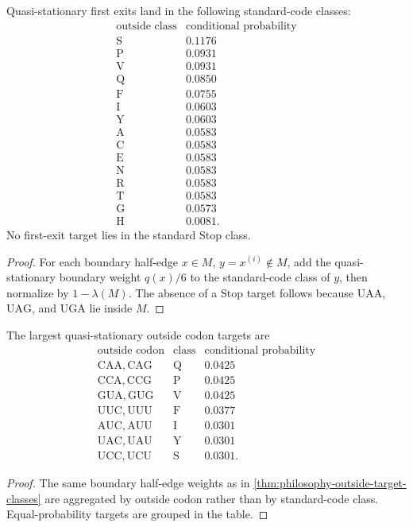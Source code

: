 \begin{theorem}
\label{thm:philosophy-outside-target-classes}
Quasi-stationary first exits land in the following standard-code classes:
$$
\begin{array}{c|r}
  \text{outside class} & \text{conditional probability}\\
  \hline
  \mathrm{S} & 0.1176\\
  \mathrm{P} & 0.0931\\
  \mathrm{V} & 0.0931\\
  \mathrm{Q} & 0.0850\\
  \mathrm{F} & 0.0755\\
  \mathrm{I} & 0.0603\\
  \mathrm{Y} & 0.0603\\
  \mathrm{A} & 0.0583\\
  \mathrm{C} & 0.0583\\
  \mathrm{E} & 0.0583\\
  \mathrm{N} & 0.0583\\
  \mathrm{R} & 0.0583\\
  \mathrm{T} & 0.0583\\
  \mathrm{G} & 0.0573\\
  \mathrm{H} & 0.0081.
\end{array}
$$
No first-exit target lies in the standard Stop class.
\end{theorem}
\begin{proof}
For each boundary half-edge $x\in M$, $y=x^{(i)}\notin M$, add the
quasi-stationary boundary weight $q(x)/6$ to the standard-code class of
$y$, then normalize by $1-\lambda(M)$. The absence of a Stop target
follows because $\mathrm{UAA}$, $\mathrm{UAG}$, and $\mathrm{UGA}$ lie
inside $M$.
\end{proof}

\begin{theorem}
\label{thm:philosophy-outside-codon-targets}
The largest quasi-stationary outside codon targets are
$$
\begin{array}{c|c|r}
  \text{outside codon} & \text{class} & \text{conditional probability}\\
  \hline
  \mathrm{CAA},\mathrm{CAG} & \mathrm{Q} & 0.0425\\
  \mathrm{CCA},\mathrm{CCG} & \mathrm{P} & 0.0425\\
  \mathrm{GUA},\mathrm{GUG} & \mathrm{V} & 0.0425\\
  \mathrm{UUC},\mathrm{UUU} & \mathrm{F} & 0.0377\\
  \mathrm{AUC},\mathrm{AUU} & \mathrm{I} & 0.0301\\
  \mathrm{UAC},\mathrm{UAU} & \mathrm{Y} & 0.0301\\
  \mathrm{UCC},\mathrm{UCU} & \mathrm{S} & 0.0301.
\end{array}
$$
\end{theorem}
\begin{proof}
The same boundary half-edge weights as in
\autoref{thm:philosophy-outside-target-classes} are aggregated by
outside codon rather than by standard-code class. Equal-probability
targets are grouped in the table.
\end{proof}

